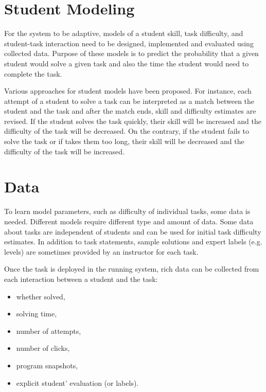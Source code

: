\section{Student Modeling}
\label{sec:student-modeling}

For the system to be adaptive, models of
  a student skill, task difficulty, and student-task interaction
  need to be designed, implemented and evaluated using collected data.
Purpose of these models is to predict the probability that a given student
  would solve a given task
  and also the time the student would need to complete the task.

Various approaches for student models have been proposed.
For instance, each attempt of a student to solve a task can be interpreted
  as a match between the student and the task and after the match ends,
  skill and difficulty estimates are revised.
If the student solves the task quickly, their skill will be increased
  and the difficulty of the task will be decreased.
On the contrary, if the student fails to solve the task or if takes them too long,
  their skill will be decreased and the difficulty of the task will be increased.


\section{Data}
\label{sec:student-modeling.data}

To learn model parameters, such as difficulty of individual tasks, some data is needed.
Different models require different type and amount of data.
Some data about tasks are independent of students and can be used
  for initial task difficulty estimates.
In addition to task statements, sample solutions and expert labels (e.g. levels)
  are sometimes provided by an instructor for each task.

Once the task is deployed in the running system,
  rich data can be collected from each interaction between a student and the task:
\begin{itemize}
  \item whether solved,
  \item solving time,
  \item number of attempts,
  \item number of clicks,
  \item program snapshots,
  \item explicit student' evaluation (or labels). %
\end{itemize}

